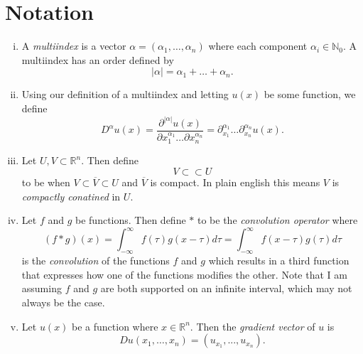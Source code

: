 \documentclass[11pt]{article}
\theoremstyle{definition}
\begin{document}
\section{Notation}
\begin{enumerate}[(i)]
	\item A \textit{multiindex} is a vector $\alpha = (\alpha_1, \dots, \alpha_n)$ where each component $\alpha_i \in \mathbb{N}_0$.
A multiindex has an order defined by
\[|\alpha| = \alpha_1 + \dots + \alpha_n.\]

\item Using our definition of a multiindex and letting $u(x)$ be some function, we define
\[D^{\alpha}u(x) = \frac{\partial^{|\alpha|}u(x)}{\partial x_1^{\alpha_1} \dots \partial x_n^{\alpha_n}} = \partial_{x_1}^{\alpha_1}\dots\partial_{x_n}^{\alpha_n}u(x).\]

\item Let $U,V \subset \mathbb{R}^n$. Then define
\[V \subset\subset U\]
to be when $V \subset \overline{V} \subset U$ and $\overline{V}$ is compact. In plain english this means $V$ is \textit{compactly conatined} in $U$.

\item Let $f$ and $g$ be functions. Then define $*$ to be the \textit{convolution operator} where
\[(f*g)(x) = \int_{-\infty}^{\infty}{f(\tau)g(x - \tau)d\tau} = \int_{-\infty}^{\infty}{f(x - \tau)g(\tau)d\tau}\]
is the \textit{convolution} of the functions $f$ and $g$ which results in a third function that expresses
how one of the functions modifies the other. Note that I am assuming $f$ and $g$ are both supported on an
infinite interval, which may not always be the case.

\item Let $u(x)$ be a function where $x \in \mathbb{R}^n$. Then the \textit{gradient vector} of $u$ is 
	\[Du(x_1,\dots,x_n) = (u_{x_1},...,u_{x_n}).\]
\end{enumerate}
\end{document}
